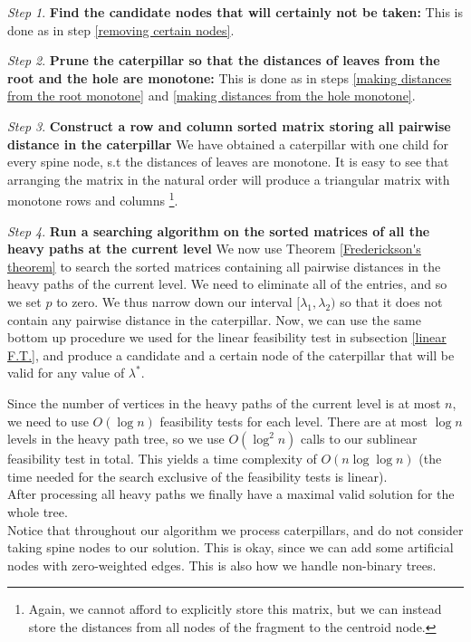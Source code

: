 \documentclass[11pt,a4paper]{article}
\theoremstyle{definition}
\theoremstyle{remark}
\newtheorem{step}{Step}[section]
\begin{document}
\begin{step}
\textbf{Find the candidate nodes that will certainly not be taken:}
This is done as in step \ref{removing certain nodes}.
\end{step}
\begin{step}
\textbf{Prune the caterpillar so that the distances of leaves from the root and the hole are monotone:}
This is done as in steps \ref{making distances from the root monotone} and \ref{making distances from the hole monotone}.
\end{step}
\begin{step}
\textbf{Construct a row and column sorted matrix storing all pairwise distance in the caterpillar}
We have obtained a caterpillar with one child for every spine node, s.t the distances of leaves are monotone. It is easy to see that arranging the matrix in the natural order will produce a triangular matrix with monotone rows and columns \footnote{Again, we cannot afford to explicitly store this matrix, but we can instead store the distances from all nodes of the fragment to the centroid node.}.
\end{step}
\begin{step}
\textbf{Run a searching algorithm on the sorted matrices of all the heavy paths at the current level}
We now use Theorem \ref{Frederickson's theorem} to search the sorted matrices containing all pairwise distances in the heavy paths of the current level. We need to eliminate all of the entries, and so we set $p$ to zero. We thus narrow down our interval $[\lambda_1,\lambda_2)$ so that it does not contain any pairwise distance in the caterpillar. Now, we can use the same bottom up procedure we used for the linear feasibility test in subsection \ref{linear F.T.}, and produce a candidate and a certain node of the caterpillar that will be valid for any value of $\lambda^*$.
\end{step}
Since the number of vertices in the heavy paths of the current level is at most $n$, we need to use $O(\log n)$ feasibility tests for each level. There are at most $\log n$ levels in the heavy path tree, so we use $O(\log ^2n)$ calls to our sublinear feasibility test in total. This yields a time complexity of $O(n \log \log n)$ (the time needed for the search exclusive of the feasibility tests is linear). \\
After processing all heavy paths we finally have a maximal valid solution for the whole tree.\\
Notice that throughout our algorithm we process caterpillars, and do not consider taking spine nodes to our solution. This is okay, since we can add some artificial nodes with zero-weighted edges. This is also how we handle non-binary trees.
\end{document}
